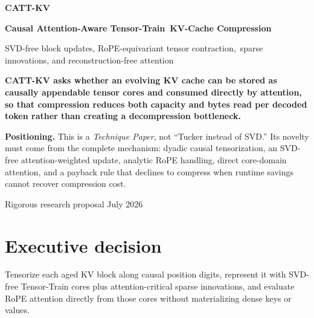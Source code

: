 \documentclass[11pt]{article}
\begin{document}

\begin{titlepage}
\centering
\vspace*{1.25cm}
{\Huge\bfseries\color{accent} CATT-KV\par}
\vspace{0.25cm}
{\Large\bfseries Causal Attention-Aware Tensor-Train\ KV-Cache Compression\par}
\vspace{0.45cm}
{\large SVD-free block updates, RoPE-equivariant tensor contraction,\ sparse innovations, and reconstruction-free attention\par}
\vspace{1.0cm}
\begin{tcolorbox}[colback=soft,colframe=accent,width=.94\textwidth,arc=3pt]
\centering\bfseries
CATT-KV asks whether an evolving KV cache can be stored as causally appendable tensor cores and
consumed directly by attention, so that compression reduces both capacity and bytes read per
decoded token rather than creating a decompression bottleneck.
\end{tcolorbox}
\vspace{.7cm}
\begin{tcolorbox}[colback=warm,colframe=accent3,width=.94\textwidth,arc=3pt]
\small
\textbf{Positioning.} This is a \emph{Technique Paper}, not ``Tucker instead of SVD.'' Its novelty
must come from the complete mechanism: dyadic causal tensorization, an SVD-free attention-weighted
update, analytic RoPE handling, direct core-domain attention, and a payback rule that declines to
compress when runtime savings cannot recover compression cost.
\end{tcolorbox}
\vfill
{\normalsize Rigorous research proposal \;\textbullet\; July 2026\par}
\end{titlepage}

\tableofcontents
\newpage
{}

\section{Executive decision}

\begin{keybox}[title={One-sentence key idea}]
Tensorize each aged KV block along causal position digits, represent it with SVD-free
Tensor-Train cores plus attention-critical sparse innovations, and evaluate RoPE attention
directly from those cores without materializing dense keys or values.
\end{keybox}
\end{document}
